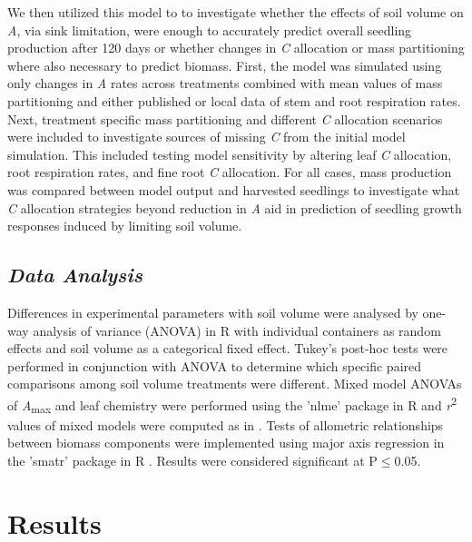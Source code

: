 \documentclass[a4paper]{article}\usepackage[]{graphicx}\usepackage[]{color}
\begin{document}
We then utilized this model to to investigate whether the effects of soil volume on \textit{A}, via sink limitation, were enough to accurately predict overall seedling production after 120 days or whether changes in \textit{C} allocation or mass partitioning where also necessary to predict biomass. First, the model was simulated using only changes in \textit{A} rates across treatments combined with mean values of mass partitioning and either published or local data of stem and root respiration rates. Next, treatment specific mass partitioning and different \textit{C} allocation scenarios were included to investigate sources of missing \textit{C} from the initial model simulation. This included testing model sensitivity by altering leaf \textit{C} allocation, root respiration rates, and fine root \textit{C} allocation. For all cases, mass production was compared between model output and harvested seedlings to investigate what \textit{C} allocation strategies beyond reduction in \textit{A} aid in  prediction of seedling growth responses induced by limiting soil volume. 

\subsection*{\textit{Data Analysis}}
Differences in experimental parameters with soil volume were analysed by one-way analysis of variance (ANOVA) in R with individual containers as random effects and soil volume as a categorical fixed effect. Tukey’s post-hoc tests were performed in conjunction with ANOVA to determine which specific paired comparisons among soil volume treatments were different. Mixed model ANOVAs of \textit{A}\textsubscript{max} and leaf chemistry were performed using the 'nlme' package \citep{nlme} in R and \textit{r}\textsuperscript{2} values of mixed models were computed as in \citet{nakagawa2013general}. Tests of allometric relationships between biomass components were implemented using major axis regression in the 'smatr' package in R \citep{warton2012smatr}. Results were considered significant at P$\leq$0.05.

\section*{Results}
\end{document}
